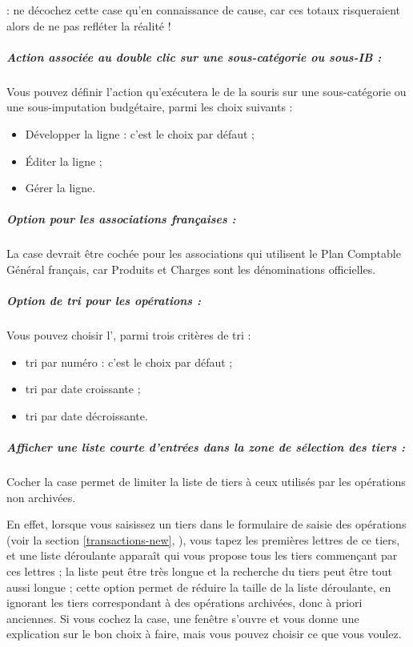  : ne décochez cette case qu'en connaissance de cause, car ces totaux risqueraient alors de ne pas refléter la réalité !


\subparagraph{Action associée au double clic sur une sous-catégorie ou sous-IB :\label{setup-display-third-mouse}}

Vous pouvez définir l'action qu'exécutera le  de la souris sur une sous-catégorie ou une sous-imputation budgétaire, parmi les choix suivants :
\begin{itemize}
	\item Développer la ligne : c'est le choix par défaut ;
	\item Éditer la ligne ;
	\item Gérer la ligne.
\end{itemize}

\subparagraph{Option pour les associations françaises :\label{setup-display-third-french}}

La case  devrait être cochée pour les associations qui utilisent le Plan Comptable Général français, car Produits et Charges sont les dénominations officielles. 


\subparagraph{Option de tri pour les opérations :\label{setup-display-third-sort}}

Vous pouvez choisir l', parmi trois critères de \gls{tri} :

\begin{itemize}
	\item tri par numéro : c'est le choix par défaut ;
	\item tri par date croissante ;
	\item tri par date décroissante.
\end{itemize} 


\subparagraph{Afficher une liste courte d'entrées dans la zone de sélection des tiers :\label{setup-display-third-list}}

Cocher la case  permet de limiter la liste de tiers à ceux utilisés par les opérations non archivées. 

En effet, lorsque vous saisissez un tiers dans le formulaire de saisie des opérations (voir la section \vref{transactions-new}, ), vous tapez les premières lettres de ce tiers, et une liste déroulante apparaît qui vous propose tous les tiers commençant par ces lettres ; la liste peut être très longue et la recherche du tiers peut être tout aussi longue ; cette option permet de réduire la taille de la liste déroulante, en ignorant les tiers correspondant à des opérations archivées, donc à priori anciennes. 
Si vous cochez la case, une fenêtre s'ouvre et vous donne une explication sur le bon choix à faire, mais vous pouvez choisir ce que vous voulez.


